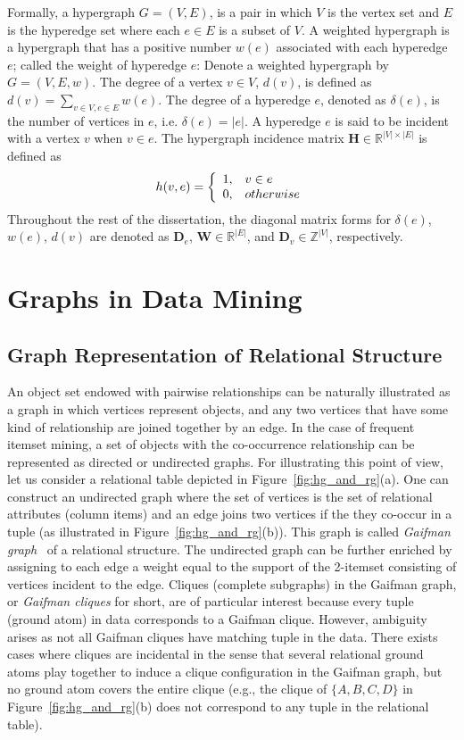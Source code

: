 Formally, a hypergraph $G = (V,E)$, is a pair in which $V$ is the vertex set and $E$ is the hyperedge set where each $e \in E$ is a subset of $V$. A weighted hypergraph is a hypergraph that has a positive number $w(e)$ associated with each hyperedge $e$; called the weight of hyperedge $e$: Denote a weighted hypergraph by $G = (V,E,w)$. The degree of a vertex $v \in V$, $d(v)$, is defined as $d(v) = \sum_{v\in V, e\in E}{w(e)}$. The degree of a hyperedge $e$, denoted as $\delta(e)$, is the number of vertices in $e$, i.e. $\delta(e)=|e|$. A hyperedge $e$ is said to be incident with a vertex $v$ when $v \in e$. The hypergraph incidence matrix $\mathbf{H} \in \mathbb{R}^{|V| \times |E|}$ is defined as
\begin{equation}
\notag h(v,e)=\left\{\begin{array}{cl}
	   1, & v \in e \\
	   0, & otherwise
	   \end{array}\right.
\end{equation}
Throughout the rest of the dissertation, the diagonal matrix forms for $\delta(e)$, $w(e)$, $d(v)$ are denoted as $\mathbf{D}_e$, $\mathbf{W} \in \mathbb{R}^{|E|}$, and $\mathbf{D}_v \in \mathbb{Z}^{|V|}$, respectively.

\section{Graphs in Data Mining}
\subsection{Graph Representation of Relational Structure}
An object set endowed with pairwise relationships can be naturally illustrated as a graph in which vertices represent objects, and any two vertices that have some kind of relationship are joined together by an edge. In the case of frequent itemset mining, a set of objects with the co-occurrence relationship can be represented as directed or undirected graphs. For illustrating this point of view, let us consider a relational table depicted in Figure~\ref{fig:hg_and_rg}(a). One can construct an undirected graph where the set of vertices is the set of relational attributes (column items) and an edge joins two vertices if the they co-occur in a tuple (as illustrated in Figure~\ref{fig:hg_and_rg}(b)). This graph is called \emph{Gaifman graph}~\cite{Hodkinson02finiteconformal} of a relational structure. The undirected graph can be further enriched by assigning to each edge a weight equal to the support of the 2-itemset consisting of vertices incident to the edge. Cliques (complete subgraphs) in the Gaifman graph, or \emph{Gaifman cliques} for short, are of particular interest because every tuple (ground atom) in data corresponds to a Gaifman clique. However, ambiguity arises as not all Gaifman cliques have matching tuple in the data. There exists cases where cliques are incidental in the sense that several relational ground atoms play together to induce a clique configuration in the Gaifman graph, but no ground atom covers the entire clique (e.g., the clique of $\{A,B,C,D\}$ in Figure~\ref{fig:hg_and_rg}(b) does not correspond to any tuple in the relational table).

